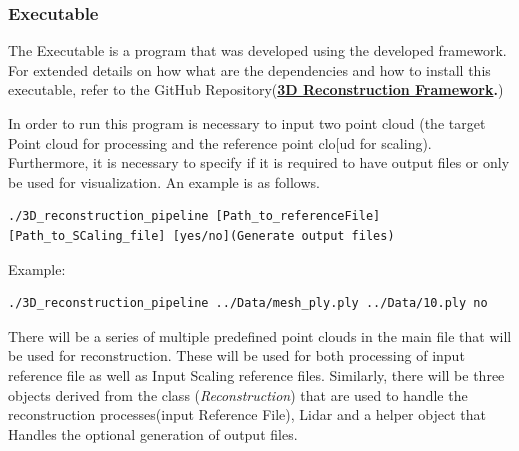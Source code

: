 \documentclass[12pt]{report}
\begin{document}
\subsubsection{Executable}
The Executable is a program that was developed using the developed framework. For extended details on how what are the dependencies and how to install this executable, 
refer to the GitHub Repository(\textbf{\href{https://github.com/esteban-andrade/3D-Reconstructrion-Scanner} {3D Reconstruction Framework}.})

In order to run this program is necessary to input two point cloud (the target Point cloud for processing and the reference point clo[ud for scaling). Furthermore, it is necessary to specify if it is required to have output files or only be used for visualization.
An example is as follows.

\scriptsize\begin{verbatim} 
./3D_reconstruction_pipeline [Path_to_referenceFile] [Path_to_SCaling_file] [yes/no](Generate output files)
\end{verbatim}
\normalsize

Example:

\small\begin{verbatim} 
./3D_reconstruction_pipeline ../Data/mesh_ply.ply ../Data/10.ply no
\end{verbatim}
\normalsize

There will be a series of multiple predefined point clouds in the main file that will be used for reconstruction. These will be used for both processing of input reference file as well as Input Scaling reference files. 
Similarly, there will be three objects derived from the class (\textit{Reconstruction}) that are used to handle the reconstruction processes(input Reference File), Lidar and a helper object that Handles the optional generation of output files. 
\end{document}
